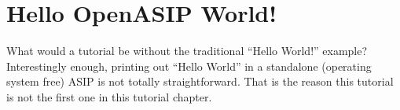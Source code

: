 \documentclass[a4paper,twoside]{tceusermanual}
\begin{document}
% 
%
%
%
%
%


%



\section{Hello OpenASIP World!}

What would a tutorial be without the traditional ``Hello World!''
example? Interestingly enough, printing out ``Hello World'' in a
standalone (operating system free) ASIP is not
totally straightforward. That is the reason this tutorial is not the first 
one in this tutorial chapter.
\end{document}
